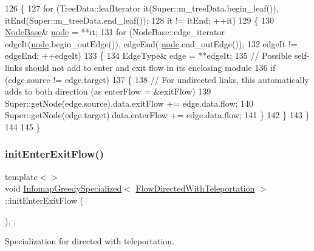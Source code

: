 \begin{DoxyCode}
126 \{
127     \textcolor{keywordflow}{for} (TreeData::leafIterator it(Super::m\_treeData.begin\_leaf()), itEnd(Super::m\_treeData.end\_leaf());
128             it != itEnd; ++it)
129     \{
130         \mbox{\hyperlink{classNodeBase}{NodeBase}}& \mbox{\hyperlink{structnode}{node}} = **it;
131         \textcolor{keywordflow}{for} (NodeBase::edge\_iterator edgeIt(\mbox{\hyperlink{structnode}{node}}.begin\_outEdge()), edgeEnd(
      \mbox{\hyperlink{structnode}{node}}.end\_outEdge());
132                 edgeIt != edgeEnd; ++edgeIt)
133         \{
134             EdgeType& edge = **edgeIt;
135             \textcolor{comment}{// Possible self-links should not add to enter and exit flow in its enclosing module}
136             \textcolor{keywordflow}{if} (edge.source != edge.target)
137             \{
138                 \textcolor{comment}{// For undirected links, this automatically adds to both direction (as enterFlow =
       &exitFlow)}
139                 Super::getNode(edge.source).data.exitFlow += edge.data.flow;
140                 Super::getNode(edge.target).data.enterFlow += edge.data.flow;
141             \}
142         \}
143     \}
144 
145 \}
\end{DoxyCode}
\mbox{\label{classInfomapGreedySpecialized_a8a43bd2e0610fb4e5a9375f1c36202ec}} 
\subsubsection{\texorpdfstring{init\+Enter\+Exit\+Flow()}{initEnterExitFlow()}\hspace{0.1cm}{\footnotesize\ttfamily [2/2]}}
{\footnotesize\ttfamily template$<$$>$ \\
void \mbox{\hyperlink{classInfomapGreedySpecialized}{Infomap\+Greedy\+Specialized}}$<$ \mbox{\hyperlink{structFlowDirectedWithTeleportation}{Flow\+Directed\+With\+Teleportation}} $>$\+::init\+Enter\+Exit\+Flow (\begin{DoxyParamCaption}{ }\end{DoxyParamCaption})\hspace{0.3cm}{\ttfamily [inline]}, {\ttfamily [protected]}, {\ttfamily [virtual]}}

Specialization for directed with teleportation. 

